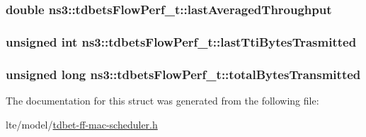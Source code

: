 \subsubsection[{\texorpdfstring{last\+Averaged\+Throughput}{lastAveragedThroughput}}]{\setlength{\rightskip}{0pt plus 5cm}double ns3\+::tdbets\+Flow\+Perf\+\_\+t\+::last\+Averaged\+Throughput}\hypertarget{structns3_1_1tdbetsFlowPerf__t_a23e9b2fa2e4695acfce6c1f42f5f051a}{}\label{structns3_1_1tdbetsFlowPerf__t_a23e9b2fa2e4695acfce6c1f42f5f051a}
\subsubsection[{\texorpdfstring{last\+Tti\+Bytes\+Trasmitted}{lastTtiBytesTrasmitted}}]{\setlength{\rightskip}{0pt plus 5cm}unsigned int ns3\+::tdbets\+Flow\+Perf\+\_\+t\+::last\+Tti\+Bytes\+Trasmitted}\hypertarget{structns3_1_1tdbetsFlowPerf__t_a42375746ea04f9120e15fa2ec4b2b460}{}\label{structns3_1_1tdbetsFlowPerf__t_a42375746ea04f9120e15fa2ec4b2b460}
\subsubsection[{\texorpdfstring{total\+Bytes\+Transmitted}{totalBytesTransmitted}}]{\setlength{\rightskip}{0pt plus 5cm}unsigned {\bf long} ns3\+::tdbets\+Flow\+Perf\+\_\+t\+::total\+Bytes\+Transmitted}\hypertarget{structns3_1_1tdbetsFlowPerf__t_a391813e0a5afb574d139e263a852c93a}{}\label{structns3_1_1tdbetsFlowPerf__t_a391813e0a5afb574d139e263a852c93a}


The documentation for this struct was generated from the following file\+:\begin{DoxyCompactItemize}
\item 
lte/model/\hyperlink{lte_2model_2tdbet-ff-mac-scheduler_8h}{tdbet-\/ff-\/mac-\/scheduler.\+h}\end{DoxyCompactItemize}
